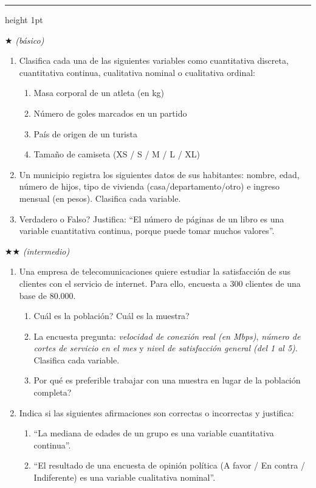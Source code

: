 \documentclass[11pt, letterpaper]{article}
\newcommand{\subbloque}[1]{%
  \vspace{14pt}
  \noindent{\large\bfseries\color{zenitnavy} #1}\par
  \vspace{4pt}\hrule height 1pt\vspace{8pt}}
\begin{document}
\subbloque{Ejercicios propuestos}

$\bigstar$ \textit{(b\'asico)}

\begin{enumerate}[label=\textbf{\arabic*.}, leftmargin=*]
  \item Clasifica cada una de las siguientes variables como cuantitativa discreta, cuantitativa continua, cualitativa nominal o cualitativa ordinal:
  \begin{enumerate}[label=\alph*)]
    \item Masa corporal de un atleta (en kg)
    \item N\'umero de goles marcados en un partido
    \item Pa\'is de origen de un turista
    \item Tama\~no de camiseta (XS / S / M / L / XL)
  \end{enumerate}

  \item Un municipio registra los siguientes datos de sus habitantes: nombre, edad, n\'umero de hijos, tipo de vivienda (casa/departamento/otro) e ingreso mensual (en pesos). Clasifica cada variable.

  \item \textquestiondown Verdadero o Falso? Justifica: ``El n\'umero de p\'aginas de un libro es una variable cuantitativa continua, porque puede tomar muchos valores''.
\end{enumerate}

$\bigstar\bigstar$ \textit{(intermedio)}

\begin{enumerate}[label=\textbf{\arabic*.}, leftmargin=*, resume]
  \item Una empresa de telecomunicaciones quiere estudiar la satisfacci\'on de sus clientes con el servicio de internet. Para ello, encuesta a 300 clientes de una base de 80.000.
  \begin{enumerate}[label=\alph*)]
    \item \textquestiondown Cu\'al es la poblaci\'on? \textquestiondown Cu\'al es la muestra?
    \item La encuesta pregunta: \textit{velocidad de conexi\'on real (en Mbps)}, \textit{n\'umero de cortes de servicio en el mes} y \textit{nivel de satisfacci\'on general (del 1 al 5)}. Clasifica cada variable.
    \item \textquestiondown Por qu\'e es preferible trabajar con una muestra en lugar de la poblaci\'on completa?
  \end{enumerate}

  \item Indica si las siguientes afirmaciones son correctas o incorrectas y justifica:
  \begin{enumerate}[label=\alph*)]
    \item ``La mediana de edades de un grupo es una variable cuantitativa continua''.
    \item ``El resultado de una encuesta de opini\'on pol\'itica (A favor / En contra / Indiferente) es una variable cualitativa nominal''.
  \end{enumerate}
\end{enumerate}
\end{document}
